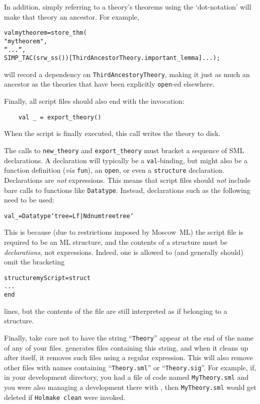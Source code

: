 In addition, simply referring to a theory's theorems using the `dot-notation' will make that theory an ancestor.
For example,
\begin{alltt}
    val mytheorem = store_thm(
      "mytheorem",
      ``...``,
      SIMP_TAC (srw_ss()) [ThirdAncestorTheory.important_lemma] ...);
\end{alltt}
will record a dependency on \texttt{ThirdAncestoryTheory}, making it just as much an ancestor as the theories that have been explicitly \texttt{open}-ed elsewhere.

Finally, all script files should also end with the invocation:
\begin{verbatim}
    val _ = export_theory()
\end{verbatim}
When the script is finally executed, this call writes the theory to disk.

The calls to \texttt{new_theory} and \texttt{export_theory} must bracket a sequence of SML declarations.
A declaration will typically be a \texttt{val}-binding, but might also be a function definition (\emph{via} \texttt{fun}), an \texttt{open}, or even a \texttt{structure} declaration.
Declarations are \emph{not} expressions.
This means that script files should \emph{not} include bare calls to \HOL{} functions like \texttt{Datatype}.
Instead, declarations such as the following need to be used:
\begin{alltt}
    val _ = Datatype`tree = Lf | Nd num tree tree`
\end{alltt}
This is because (due to restrictions imposed by Moscow~ML) the script file is required to be an ML structure, and the contents of a structure must be \emph{declarations}, not expressions.
Indeed, one is allowed to (and generally should) omit the bracketing
\begin{alltt}
  structure myScript = struct
  ...
  end
\end{alltt}
lines, but the contents of the file are still interpreted as if belonging to a structure.

Finally, take care not to have the string ``\texttt{Theory}'' appear at the end of the name of any of your files.
\HOL{} generates files containing this string, and when it cleans up after itself, it removes such files using a regular expression.
This will also remove other files with names containing ``\texttt{Theory.sml}'' or ``\texttt{Theory.sig}''.
For example, if, in your development directory, you had a file of \ML{} code named \texttt{MyTheory.sml} and you were also managing a \HOL{} development there with \holmake, then \texttt{MyTheory.sml} would get deleted if \texttt{Holmake~clean} were invoked.

